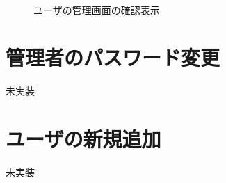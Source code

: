 \documentclass[11ptm]{jsarticle}
\begin{document}
\begin{figure}[h]
\begin{minipage}[h]{0.3\linewidth}
\begin{minipage}[h]{\linewidth}
    \end{minipage}\\
    \bigskip
    \begin{minipage}[h]{\linewidth}
      \caption{\label{fig:ユーザの管理画面の確認表示}ユーザの管理画面の確認表示}
    \end{minipage}
  \end{minipage}
\end{figure}


\clearpage
\section{管理者のパスワード変更}
\label{sec:管理者のパスワード変更}
未実装


\section{ユーザの新規追加}
\label{sec:ユーザの新規追加}

未実装


\clearpage

\thispagestyle{fancy}\thispagestyle{fancy}
\chead{}
\rhead{}
\lfoot{}
\cfoot{\thepage}
\rfoot{}
\end{document}
